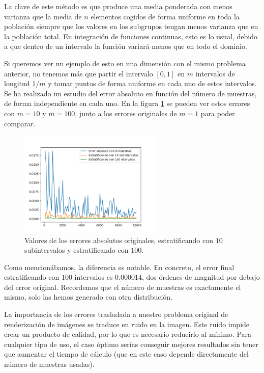 \documentclass{scrbook}
\begin{document}
La clave de este método es que produce una media ponderada con menos varianza que la media de $n$ elementos cogidos de forma uniforme en toda la población siempre que los valores en los subgrupos tengan menos varianza que en la población total. En integración de funciones continuas, esto es lo usual, debido a que dentro de un intervalo la función variará menos que en todo el dominio. 

Si queremos ver un ejemplo de esto en una dimensión con el mismo problema anterior, no tenemos más que partir el intervalo $[0,1]$ en $m$ intervalos de longitud $1/m$ y tomar puntos de forma uniforme en cada uno de estos intervalos. Se ha realizado un estudio del error absoluto en función del número de muestras, de forma independiente en cada uno. En la figura \ref{fig:strat} se pueden ver estos errores con $m=10$ y $m=100$, junto a los errores originales de $m=1$ para poder comparar.

\begin{figure}[ht]
	\centering
	\includegraphics[width=0.6\textwidth]{error_estratificando}
	\caption{Valores de los errores absolutos originales, estratificando con $10$ subintervalos y estratificando con $100$.}
	\label{fig:strat}
\end{figure}

Como mencionábamos, la diferencia es notable. En concreto, el error final estratificando con $100$ intervalos es $0.000014$, dos órdenes de magnitud por debajo del error original. Recordemos que el número de muestras es exactamente el mismo, solo las hemos generado con otra distribución.

La importancia de los errores trasladada a nuestro problema original de renderización de imágenes se traduce en ruido en la imagen. Este ruido impide crear un producto de calidad, por lo que es necesario reducirlo al mínimo. Para cualquier tipo de uso, el caso óptimo serías conseguir mejores resultados sin tener que aumentar el tiempo de cálculo (que en este caso depende directamente del número de muestras usadas).
\end{document}
